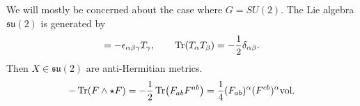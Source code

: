 We will mostly be concerned about the case where $G = SU(2)$.
The Lie algebra $\mathfrak{su}(2)$ is generated by
\begin{equation}
  [T^{\alpha}, T_{\beta} ] = -\epsilon_{\alpha\beta\gamma} T_{\gamma}, \qquad \Tr(T_{\alpha} T_{\beta}) = -\frac{1}{2} \delta_{\alpha\beta}.
\end{equation}
Then $X \in \mathfrak{su}(2)$ are anti-Hermitian metrics.
\begin{equation}
  - \Tr(F \wedge \star F) = -\frac{1}{2} \Tr(F_{ab} F^{ab}) = \frac{1}{4} (F_{ab})^{\alpha} (F^{cb})^{\alpha} \text{vol}.
\end{equation}
